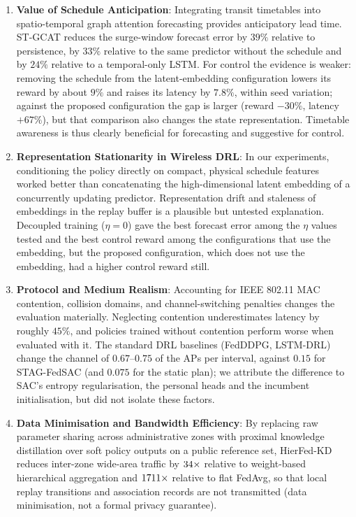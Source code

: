 \begin{enumerate}
  \item \textbf{Value of Schedule Anticipation}: Integrating transit timetables into spatio-temporal graph attention forecasting provides anticipatory lead time. ST-GCAT reduces the surge-window forecast error by $39\%$ relative to persistence, by $33\%$ relative to the same predictor without the schedule and by $24\%$ relative to a temporal-only LSTM. For control the evidence is weaker: removing the schedule from the latent-embedding configuration lowers its reward by about $9\%$ and raises its latency by $7.8\%$, within seed variation; against the proposed configuration the gap is larger (reward $-30\%$, latency $+67\%$), but that comparison also changes the state representation. Timetable awareness is thus clearly beneficial for forecasting and suggestive for control.
  \item \textbf{Representation Stationarity in Wireless DRL}: In our experiments, conditioning the policy directly on compact, physical schedule features worked better than concatenating the high-dimensional latent embedding of a concurrently updating predictor. Representation drift and staleness of embeddings in the replay buffer is a plausible but untested explanation. Decoupled training ($\eta=0$) gave the best forecast error among the $\eta$ values tested and the best control reward among the configurations that use the embedding, but the proposed configuration, which does not use the embedding, had a higher control reward still.
  \item \textbf{Protocol and Medium Realism}: Accounting for IEEE 802.11 MAC contention, collision domains, and channel-switching penalties changes the evaluation materially. Neglecting contention underestimates latency by roughly $45\%$, and policies trained without contention perform worse when evaluated with it. The standard DRL baselines (FedDDPG, LSTM-DRL) change the channel of $0.67$--$0.75$ of the APs per interval, against $0.15$ for STAG-FedSAC (and $0.075$ for the static plan); we attribute the difference to SAC's entropy regularisation, the personal heads and the incumbent initialisation, but did not isolate these factors.
  \item \textbf{Data Minimisation and Bandwidth Efficiency}: By replacing raw parameter sharing across administrative zones with proximal knowledge distillation over soft policy outputs on a public reference set, HierFed-KD reduces inter-zone wide-area traffic by $34\times$ relative to weight-based hierarchical aggregation and $1711\times$ relative to flat FedAvg, so that local replay transitions and association records are not transmitted (data minimisation, not a formal privacy guarantee).
\end{enumerate}

